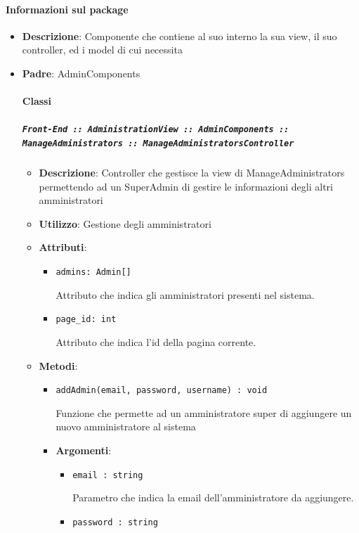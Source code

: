 \documentclass[../DefinizioneDiProdotto.tex]{subfiles}
\begin{document}
	\paragraph{Informazioni sul package}\begin{itemize}\item \textbf{Descrizione}: Componente che contiene al suo interno la sua view, il suo controller, ed i model di cui necessita\item \textbf{Padre}: AdminComponents\paragraph{Classi}
	\subparagraph{\texttt{Front-End :: AdministrationView :: AdminComponents :: ManageAdministrators :: ManageAdministratorsController}}
	\begin{itemize}\item \textbf{Descrizione}: Controller che gestisce la view di ManageAdministrators permettendo ad un SuperAdmin di gestire le informazioni degli altri amministratori
	\item \textbf{Utilizzo}: Gestione degli amministratori
	\item \textbf{Attributi}:
	\begin{itemize}
	\item \texttt{admins: Admin[]}\

	 Attributo che indica gli amministratori presenti nel sistema.
	\end{itemize}
	\begin{itemize}
	\item \texttt{page\_id: int}\

	 Attributo che indica l'id della pagina corrente.
	\end{itemize}
	\item \textbf{Metodi}:
	\begin{itemize}
	\item \texttt{addAdmin(email, password, username) : void}\

	 Funzione che permette ad un amministratore super di aggiungere un nuovo amministratore al sistema

	\item \textbf{Argomenti}:
	\begin{itemize}
	\item \texttt{email : string}\

	 Parametro che indica la email dell'amministratore da aggiungere.
	\item \texttt{password : string}\


\end{itemize}
\end{itemize}
\end{itemize}
\end{itemize}
\end{document}
